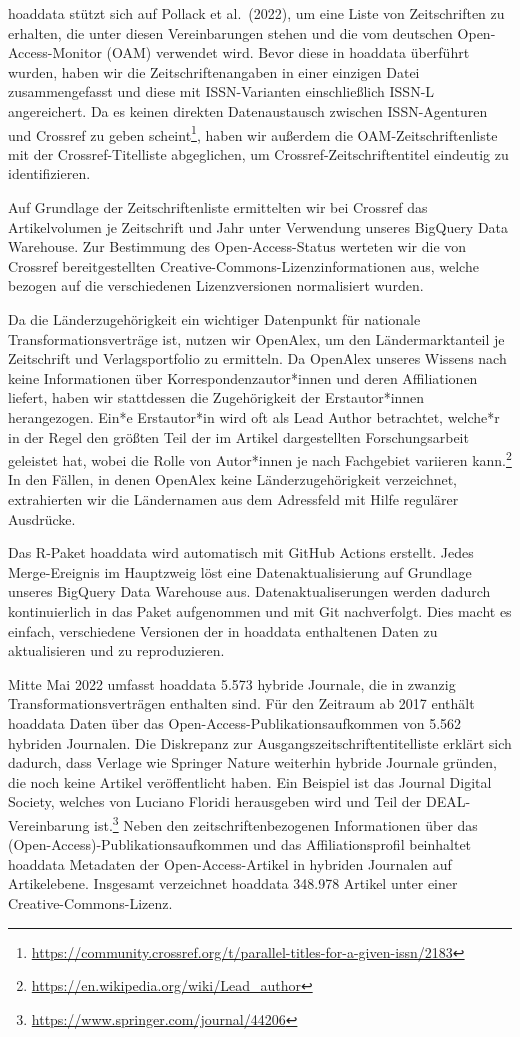 \documentclass[a4paper,
fontsize=11pt,
oneside,
numbers=noperiodatend,
parskip=half-,
bibliography=totoc,
final
]{scrartcl}
\begin{document}
hoaddata stützt sich auf Pollack et al.~(2022), um eine Liste von
Zeitschriften zu erhalten, die unter diesen Vereinbarungen stehen und
die vom deutschen Open-Access-Monitor (OAM) verwendet wird. Bevor diese
in hoaddata überführt wurden, haben wir die Zeitschriftenangaben in
einer einzigen Datei zusammengefasst und diese mit ISSN-Varianten
einschließlich ISSN-L angereichert. Da es keinen direkten Datenaustausch
zwischen ISSN-Agenturen und Crossref zu geben scheint\footnote{\url{https://community.crossref.org/t/parallel-titles-for-a-given-issn/2183}},
haben wir außerdem die OAM-Zeitschriftenliste mit der
Crossref-Titelliste abgeglichen, um Crossref-Zeitschriftentitel
eindeutig zu identifizieren.

Auf Grundlage der Zeitschriftenliste ermittelten wir bei Crossref das
Artikelvolumen je Zeitschrift und Jahr unter Verwendung unseres BigQuery
Data Warehouse. Zur Bestimmung des Open-Access-Status werteten wir die
von Crossref bereitgestellten Creative-Commons-Lizenzinformationen aus,
welche bezogen auf die verschiedenen Lizenzversionen normalisiert
wurden.

Da die Länderzugehörigkeit ein wichtiger Datenpunkt für nationale
Transformationsverträge ist, nutzen wir OpenAlex, um den
Ländermarktanteil je Zeitschrift und Verlagsportfolio zu ermitteln. Da
OpenAlex unseres Wissens nach keine Informationen über
Korrespondenzautor*innen und deren Affiliationen liefert, haben wir
stattdessen die Zugehörigkeit der Erstautor*innen herangezogen. Ein*e
Erstautor*in wird oft als Lead Author betrachtet, welche*r in der Regel
den größten Teil der im Artikel dargestellten Forschungsarbeit geleistet
hat, wobei die Rolle von Autor*innen je nach Fachgebiet variieren
kann.\footnote{\url{https://en.wikipedia.org/wiki/Lead_author}} In den
Fällen, in denen OpenAlex keine Länderzugehörigkeit verzeichnet,
extrahierten wir die Ländernamen aus dem Adressfeld mit Hilfe regulärer
Ausdrücke.

Das R-Paket hoaddata wird automatisch mit GitHub Actions erstellt. Jedes
Merge-Ereignis im Hauptzweig löst eine Datenaktualisierung auf Grundlage
unseres BigQuery Data Warehouse aus. Datenaktualiserungen werden dadurch
kontinuierlich in das Paket aufgenommen und mit Git nachverfolgt. Dies
macht es einfach, verschiedene Versionen der in hoaddata enthaltenen
Daten zu aktualisieren und zu reproduzieren.

Mitte Mai 2022 umfasst hoaddata 5.573 hybride Journale, die in zwanzig
Transformationsverträgen enthalten sind. Für den Zeitraum ab 2017
enthält hoaddata Daten über das Open-Access-Publikationsaufkommen von
5.562 hybriden Journalen. Die Diskrepanz zur
Ausgangszeitschriftentitelliste erklärt sich dadurch, dass Verlage wie
Springer Nature weiterhin hybride Journale gründen, die noch keine
Artikel veröffentlicht haben. Ein Beispiel ist das Journal Digital
Society, welches von Luciano Floridi herausgeben wird und Teil der
DEAL-Vereinbarung ist.\footnote{\url{https://www.springer.com/journal/44206}}
Neben den zeitschriftenbezogenen Informationen über das
(Open-Access)-Publikationsaufkommen und das Affiliationsprofil
beinhaltet hoaddata Metadaten der Open-Access-Artikel in hybriden
Journalen auf Artikelebene. Insgesamt verzeichnet hoaddata 348.978
Artikel unter einer Creative-Commons-Lizenz.
\end{document}
